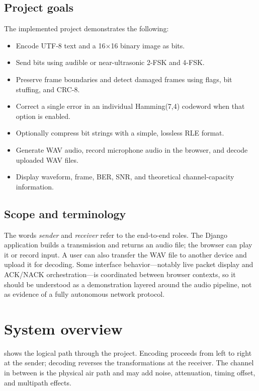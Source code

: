 \documentclass[11pt,a4paper]{article}
\begin{document}
\subsection{Project goals}
The implemented project demonstrates the following:
\begin{itemize}
    \item Encode UTF-8 text and a 16$\times$16 binary image as bits.
    \item Send bits using audible or near-ultrasonic 2-FSK and 4-FSK.
    \item Preserve frame boundaries and detect damaged frames using flags, bit stuffing, and CRC-8.
    \item Correct a single error in an individual Hamming(7,4) codeword when that option is enabled.
    \item Optionally compress bit strings with a simple, lossless RLE format.
    \item Generate WAV audio, record microphone audio in the browser, and decode uploaded WAV files.
    \item Display waveform, frame, BER, SNR, and theoretical channel-capacity information.
\end{itemize}

\subsection{Scope and terminology}
The words \emph{sender} and \emph{receiver} refer to the end-to-end roles. The Django application builds a transmission and returns an audio file; the browser can play it or record input. A user can also transfer the WAV file to another device and upload it for decoding. Some interface behavior---notably live packet display and ACK/NACK orchestration---is coordinated between browser contexts, so it should be understood as a demonstration layered around the audio pipeline, not as evidence of a fully autonomous network protocol.

\section{System overview}
\label{sec:architecture}

 shows the logical path through the project. Encoding proceeds from left to right at the sender; decoding reverses the transformations at the receiver. The channel in between is the physical air path and may add noise, attenuation, timing offset, and multipath effects.
\end{document}
